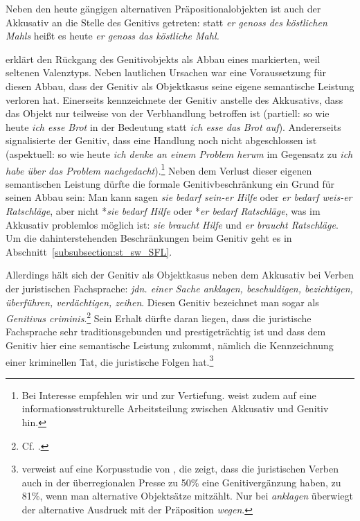 Neben den heute gängigen alternativen Präpositionalobjekten ist auch der Akkusativ an die Stelle des Genitivs getreten: statt \textit{er genoss des köstlichen Mahls} heißt es heute \textit{er genoss das köstliche Mahl.} 

\citet[71--74]{Wurzel1994} erklärt den Rückgang des Genitivobjekts als Abbau eines markierten, weil seltenen Valenztyps. Neben lautlichen Ursachen war eine Voraussetzung für diesen Abbau, dass der Genitiv als Objektkasus seine eigene semantische Leistung verloren hat. Einerseits kennzeichnete der Genitiv anstelle des Akkusativs, dass das Objekt nur teilweise von der Verbhandlung betroffen ist (partiell: so wie heute \textit{ich esse Brot} in der Bedeutung  statt \textit{ich esse das Brot auf}). Andererseits signalisierte der Genitiv, dass eine Handlung noch nicht abgeschlossen ist (aspektuell: so wie heute \textit{ich denke an einem Problem herum} im Gegensatz zu \textit{ich habe über das Problem nachgedacht}).\footnote{Bei Interesse empfehlen wir \citet{Donhauser1998} und \citet{Habermann2007} zur Vertiefung. \citet[93--95]{Habermann2007} weist zudem auf eine informationsstrukturelle Arbeitsteilung zwischen Akkusativ und Genitiv hin.} Neben dem Verlust dieser eigenen semantischen Leistung dürfte die formale Genitivbeschränkung ein Grund für seinen Abbau sein: Man kann sagen \textit{sie bedarf sein-er Hilfe} oder \textit{er bedarf weis-er Ratschläge}, aber nicht *\textit{sie bedarf Hilfe} oder *\textit{er bedarf Ratschläge}, was im Akkusativ problemlos möglich ist: \textit{sie braucht Hilfe} und \textit{er braucht Ratschläge}. Um die dahinterstehenden Beschränkungen beim Genitiv geht es in Abschnitt~\ref{subsubsection:st_sw_SFL}. 

Allerdings hält sich der Genitiv als Objektkasus neben dem Akkusativ bei Verben der juristischen Fachsprache: \textit{jdn. einer Sache anklagen, beschuldigen, bezichtigen, überführen,  verdächtigen, zeihen}. Diesen Genitiv bezeichnet man sogar als \textit{Genitivus criminis}.\footnote{Cf. \citet[508, §844]{Duden2022}.} Sein Erhalt dürfte daran liegen, dass die juristische Fachsprache sehr traditionsgebunden und prestigeträchtig ist und dass dem Genitiv hier eine semantische Leistung zukommt, nämlich die Kennzeichnung einer kriminellen Tat, die juristische Folgen hat.\footnote{\citet[78]{Agel2008Fehler} verweist auf eine Korpusstudie von \citet{diegel2007}, die zeigt, dass die juristischen Verben auch in der überregionalen Presse zu 50\% eine Genitivergänzung haben, zu 81\%, wenn man alternative Objektsätze mitzählt. Nur bei \textit{anklagen} überwiegt der alternative Ausdruck mit der Präposition \textit{wegen}.}

